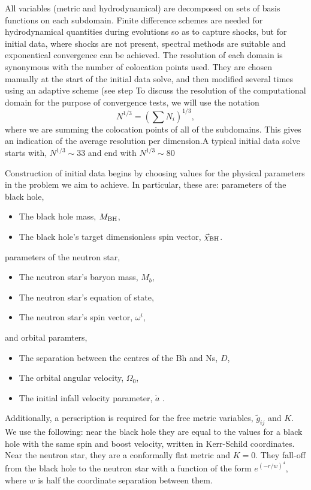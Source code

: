 All variables (metric and hydrodynamical) are decomposed on sets of
basis functions on each subdomain. Finite difference schemes are
needed for hydrodynamical quantities during evolutions so as to
capture shocks, but for initial data, where shocks are not present,
spectral methods are suitable and exponentical convergence can be
achieved. The resolution of each domain is synonymous with the
number of colocation points used. They are chosen manually at the
start of the initial data solve, and then modified several times using
an adaptive scheme (see step  To discuss the resolution of the computational domain for the purpose of convergence tests, we will use the notation
\begin{equation}
N^{1/3}=\left(\sum N_i\right)^{1/3},
\end{equation}
where we are summing the colocation points of all of the
subdomains. This gives an indication of the average resolution per dimension.A typical initial data solve starts with, $N^{1/3}\sim 33$ and end with $N^{1/3}\sim 80$

Construction of initial data begins by choosing values for the
physical parameters in the problem we aim to achieve. In particular,
these are: parameters of the black hole,
\begin{itemize}
\item The black hole mass, $M_{\rm BH}$,
\item The black hole's target dimensionless spin vector,
  $\vec{\chi}_{\rm BH}$.
\end{itemize}
parameters of the neutron star,
\begin{itemize}
\item The neutron star's baryon mass, $M_{b}$,
\item The neutron star's equation of state, 
\item The neutron star's spin vector, $\omega^i$,
\end{itemize}
and orbital paramters,
\begin{itemize}
\item The separation between the centres of the Bh and Ns, $D$,
\item The orbital angular velocity, $\Omega_0$,
\item The initial infall velocity parameter, $\dot{a}$
.
\end{itemize}
Additionally,  a perscription is required for the free
metric variables, $\tilde{g}_{ij}$ and $K$. We use the following: near the black hole they
are equal to the values for a black hole with the same spin and boost
velocity,
written in Kerr-Schild coordinates. Near the neutron star, they are a
conformally flat metric and $K=0$. They fall-off from the black hole
to the neutron star with a function of the form $e^{(-r/w)^4}$, where
$w$ is half the coordinate separation between them.

